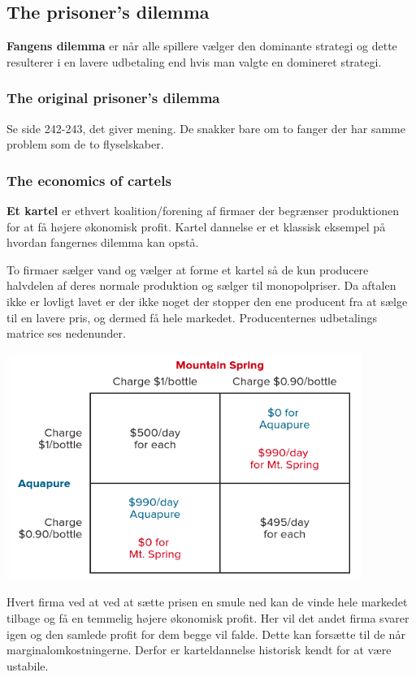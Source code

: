 \subsection{The prisoner's dilemma}
\textbf{Fangens dilemma} er når alle spillere vælger den dominante strategi og dette resulterer i en lavere udbetaling end hvis man valgte en domineret strategi. 

\subsubsection{The original prisoner's dilemma}
Se side 242-243, det giver mening. De snakker bare om to fanger der har samme problem som de to flyselskaber. 

\subsubsection{The economics of cartels}
\textbf{Et kartel} er ethvert koalition/forening af firmaer der begrænser produktionen for at få højere økonomisk profit. Kartel dannelse er et klassisk eksempel på hvordan fangernes dilemma kan opstå.

\begin{eks} \textbf{} %
\newline
To firmaer sælger vand og vælger at forme et kartel så de kun producere halvdelen af deres normale produktion og sælger til monopolpriser. Da aftalen ikke er lovligt lavet er der ikke noget der stopper den ene producent fra at sælge til en lavere pris, og dermed få hele markedet. Producenternes udbetalings matrice ses nedenunder.

\includegraphics[scale=0.7]{Afsnit/Lektion5/udbetalingsmatriceforvand.png}

Hvert firma ved at ved at sætte prisen en smule ned kan de vinde hele markedet tilbage og få en temmelig højere økonomisk profit. Her vil det andet firma svarer igen og den samlede profit for dem begge vil falde. Dette kan forsætte til de når marginalomkostningerne. Derfor er karteldannelse historisk kendt for at være ustabile. 
\end{eks}

